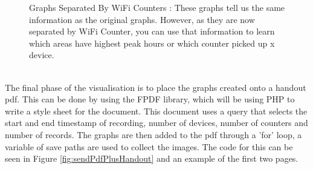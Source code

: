 \documentclass{report}
\begin{document}
\begin{figure}[h!]
    \caption{Graphs Separated By WiFi Counters : These graphs tell us the same information as the original graphs. However, as they are now separated by WiFi Counter, you can use that information to learn which areas have highest peak hours or which counter picked up x device. }
    \label{fig:sepbycountersgraphs}
\end{figure}  \\
The final phase of the visualisation is to place the graphs created onto a handout pdf. This can be done by using the FPDF library\cite{FPDF}, which will be using PHP to write a style sheet for the document. This document uses a query that selects the start and end timestamp of recording, number of devices, number of counters and number of records. The graphs are then added to the pdf through a 'for' loop, a variable of save paths are used to collect the images. The code for this can be seen in Figure \ref{fig:sendPdfPlusHandout} and an example of the first two pages. \\ \newline
\clearpage
\end{document}
